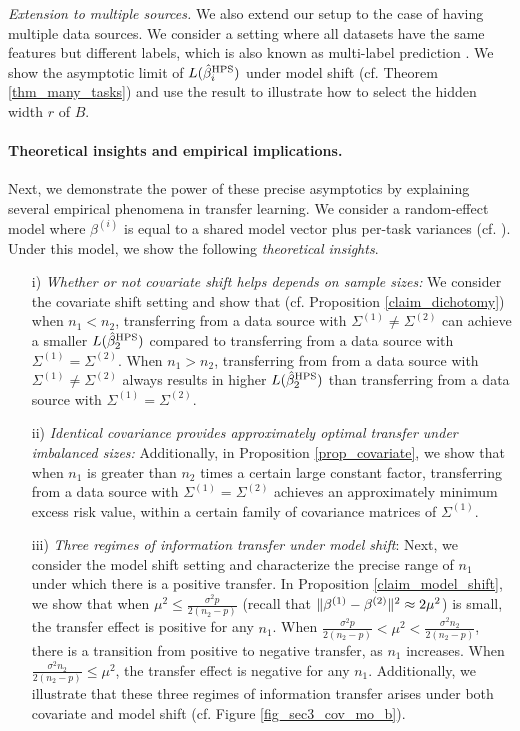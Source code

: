 \noindent\textit{Extension to multiple sources.}
We also extend our setup to the case of having multiple data sources.
We consider a setting where all datasets have the same features but different labels, which is also known as multi-label prediction \cite{hsu2009multi}.
We show the asymptotic limit of $L(\hat{\beta}_i^{\textup{HPS}})$ under model shift (cf. Theorem \ref{thm_many_tasks}) and use the result to illustrate how to select the hidden width $r$ of $B$.

\paragraph{Theoretical insights and empirical implications.} Next, we demonstrate the power of these precise asymptotics by explaining several empirical phenomena in transfer learning.
We consider a random-effect model where $\beta^{(i)}$ is equal to a shared model vector plus per-task variances (cf. \citet{dobriban2018high}).
Under this model, we show the following \textit{theoretical insights}.
\begin{enumerate}
    \item[i)] \textit{Whether or not covariate shift helps depends on sample sizes:} We consider the covariate shift setting and show that (cf. Proposition \ref{claim_dichotomy}) when $n_1 < n_2$, transferring from a data source with $\Sigma^{(1)} \neq \Sigma^{(2)}$ can achieve a smaller $L(\hat{\beta}_2^{\textup{HPS}})$ compared to transferring from a data source with $\Sigma^{(1)} = \Sigma^{(2)}$. When $n_1 > n_2$, transferring from from a data source with $\Sigma^{(1)} \neq \Sigma^{(2)}$ always results in higher $L(\hat{\beta}_2^{\textup{HPS}})$ than transferring from a data source with $\Sigma^{(1)} = \Sigma^{(2)}$.
    \item[ii)] \textit{Identical covariance provides approximately optimal transfer under imbalanced sizes:} Additionally, in Proposition \ref{prop_covariate}, we show that when $n_1$ is greater than $n_2$ times a certain large constant factor, transferring from a data source with $\Sigma^{(1)} = \Sigma^{(2)}$ achieves an approximately minimum excess risk value, within a certain family of covariance matrices of $\Sigma^{(1)}$.
    \item[iii)] \textit{Three regimes of information transfer under model shift}: Next, we consider the model shift setting and characterize the precise range of $n_1$ under which there is a positive transfer.
    In Proposition \ref{claim_model_shift}, we show that when $\mu^2 \le \frac{\sigma^2 p}{2(n_2 - p)}$ (recall that $\|\beta^{(1)} - \beta^{(2)}\|^2 \approx 2\mu^2$) is small, the transfer effect is positive for any $n_1$.
    When $\frac{\sigma^2 p}{2(n_2 - p)} < \mu^2 < \frac{\sigma^2 n_2}{2(n_2 - p)}$, there is a transition from positive to negative transfer, as $n_1$ increases.
    When $\frac{\sigma^2 n_2}{2(n_2 - p)} \le \mu^2$, the transfer effect is negative for any $n_1$.
    Additionally, we illustrate that these three regimes of information transfer arises under both covariate and model shift (cf. Figure \ref{fig_sec3_cov_mo_b}).
\end{enumerate}

